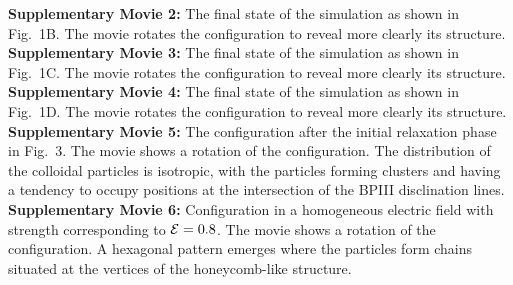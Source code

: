 \documentclass[12pt,twoside]{article}
\begin{document}
{\bf Supplementary Movie 2:} 
The final state of the simulation as shown in Fig.~1B. The movie
rotates the configuration to reveal more clearly its structure.\\


{\bf Supplementary Movie 3:} 
The final state of the simulation as shown in Fig.~1C. The movie
rotates the configuration to reveal more clearly its structure.\\


{\bf Supplementary Movie 4:} 
The final state of the simulation as shown in Fig.~1D. The movie
rotates the configuration to reveal more clearly its structure.\\


{\bf Supplementary Movie 5:} 
The configuration after the initial relaxation phase in Fig.~3. The movie
shows a rotation of the configuration. The distribution of the colloidal
particles is isotropic, with the particles forming clusters and having a
tendency to occupy positions at the intersection of the BPIII disclination
lines.\\

{\bf Supplementary Movie 6:} 
Configuration in a homogeneous electric field with strength
corresponding to ${\cal E}=0.8$. The movie
shows a rotation of the configuration.
A hexagonal pattern emerges where the particles form chains
situated at the vertices of the honeycomb-like structure. \\
\end{document}
